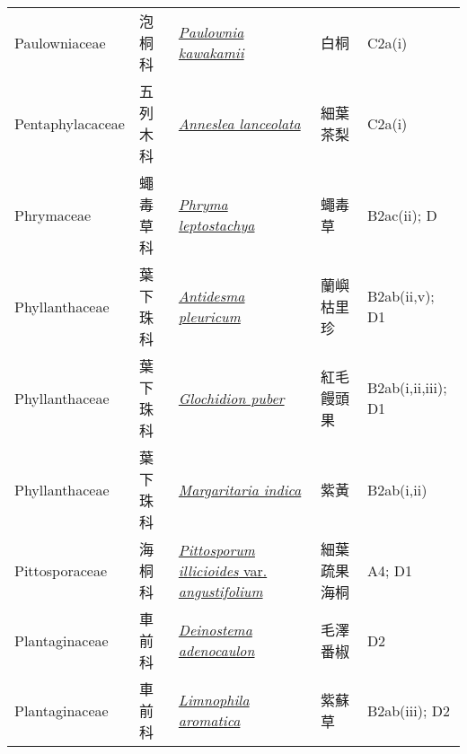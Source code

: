 {\begin{longtable}{p{2.5cm}p{2cm}p{5cm}p{2.5cm}p{3cm}}
    Paulowniaceae & 泡桐科 & \href{http://www.theplantlist.org/tpl1.1/search?q=Paulownia+kawakamii}{\textit{Paulownia kawakamii} } & 白桐 & C2a(i) \index{Paulownia@\textit{Paulownia}!kawakamii@\textit{kawakamii}}  \index{白桐} \\
    Pentaphylacaceae & 五列木科 & \href{http://www.theplantlist.org/tpl1.1/search?q=Anneslea+lanceolata}{\textit{Anneslea lanceolata} } & 細葉茶梨 & C2a(i) \index{Anneslea@\textit{Anneslea}!lanceolata@\textit{lanceolata}}  \index{細葉茶梨} \\
    Phrymaceae & 蠅毒草科 & \href{http://www.theplantlist.org/tpl1.1/search?q=Phryma+leptostachya}{\textit{Phryma leptostachya} } & 蠅毒草 & B2ac(ii); D \index{Phryma@\textit{Phryma}!leptostachya@\textit{leptostachya}}  \index{蠅毒草} \\
    Phyllanthaceae & 葉下珠科 & \href{http://www.theplantlist.org/tpl1.1/search?q=Antidesma+pleuricum}{\textit{Antidesma pleuricum} } & 蘭嶼枯里珍 & B2ab(ii,v); D1 \index{Antidesma@\textit{Antidesma}!pleuricum@\textit{pleuricum}}  \index{蘭嶼枯里珍} \\
    Phyllanthaceae & 葉下珠科 & \href{http://www.theplantlist.org/tpl1.1/search?q=Glochidion+puber}{\textit{Glochidion puber} } & 紅毛饅頭果 & B2ab(i,ii,iii); D1 \index{Glochidion@\textit{Glochidion}!puber@\textit{puber}}  \index{紅毛饅頭果} \\
    Phyllanthaceae & 葉下珠科 & \href{http://www.theplantlist.org/tpl1.1/search?q=Margaritaria+indica}{\textit{Margaritaria indica} } & 紫黃 & B2ab(i,ii) \index{Margaritaria@\textit{Margaritaria}!indica@\textit{indica}}  \index{紫黃} \\
    Pittosporaceae & 海桐科 & \href{http://www.theplantlist.org/tpl1.1/search?q=Pittosporum+illicioides+var.+angustifolium}{\textit{Pittosporum illicioides} var. \textit{angustifolium} } & 細葉疏果海桐 & A4; D1 \index{Pittosporum@\textit{Pittosporum}!illicioides@\textit{illicioides}!var. angustifolium@var. \textit{angustifolium}}  \index{細葉疏果海桐} \\
    Plantaginaceae & 車前科 & \href{http://www.theplantlist.org/tpl1.1/search?q=Deinostema+adenocaulon}{\textit{Deinostema adenocaulon} } & 毛澤番椒 & D2 \index{Deinostema@\textit{Deinostema}!adenocaulon@\textit{adenocaulon}}  \index{毛澤番椒} \\
    Plantaginaceae & 車前科 & \href{http://www.theplantlist.org/tpl1.1/search?q=Limnophila+aromatica}{\textit{Limnophila aromatica} } & 紫蘇草 & B2ab(iii); D2 \index{Limnophila@\textit{Limnophila}!aromatica@\textit{aromatica}}  \index{紫蘇草} \\

\end{longtable}}
